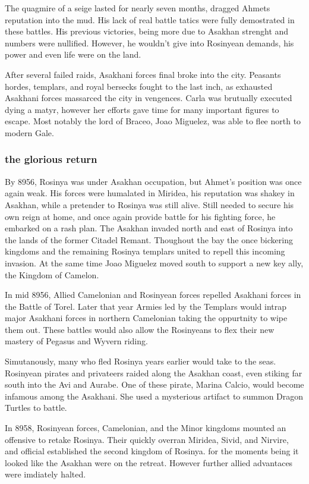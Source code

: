 \documentclass[../main.tex]{subfiles}
\begin{document}
The quagmire of a seige lasted for nearly seven months, dragged Ahmets reputation into the mud. 
His lack of real battle tatics were fully demostrated in these battles. 
His previous victories, being more due to Asakhan strenght and numbers
were nullified. However, he wouldn't give into Rosinyean demands, his power and even life were on the land.

After several failed raids, Asakhani forces final broke into the city. Peasants hordes, templars, and royal 
bersecks fought to the last inch, as exhausted Asakhani forces massarced the city in vengences. Carla 
was brutually executed dying a matyr, however her efforts gave time for many important figures to escape. 
Most notably the lord of Braceo, Joao Miguelez, was able to flee north to modern Gale.

\subsubsection{the glorious return}
By 8956, Rosinya was under Asakhan occupation, but Ahmet's position was once again weak. His forces 
were humalated in Miridea, his reputation was shakey in Asakhan, while a pretender to Rosinya was 
still alive. Still needed to secure his own reign at home, and once again provide battle for his fighting
force, he embarked on a rash plan. The Asakhan invaded north and east of Rosinya into the lands of the 
former Citadel Remant. Thoughout the bay the once bickering kingdoms and the remaining Rosinya templars 
united to repell this incoming invasion. At the same time Joao Miguelez moved south to support a new 
key ally, the Kingdom of Camelon. 

In mid 8956, Allied Camelonian and Rosinyean forces repelled Asakhani forces in the Battle of Torel.
Later that year Armies led by the Templars would intrap major Asakhani forces in northern Camelonian
taking the oppurtnity to wipe them out. These battles would also allow the Rosinyeans to flex their 
new mastery of Pegasus and Wyvern riding. 

Simutanously, many who fled Rosinya years earlier would take to
the seas. Rosinyean pirates and privateers raided along the Asakhan coast, even stiking far south into 
the Avi and Aurabe. One of these pirate, Marina Calcio, would become infamous among the Asakhani. She
used a mysterious artifact to summon Dragon Turtles to battle.

In 8958, Rosinyean forces, Camelonian, and the Minor kingdoms mounted an offensive to retake Rosinya.
Their quickly overran Miridea, Sivid, and Nirvire, and official established the second kingdom of Rosinya.
for the moments being it looked like the Asakhan were on the retreat. However further allied advantaces 
were imdiately halted. 
\end{document}
